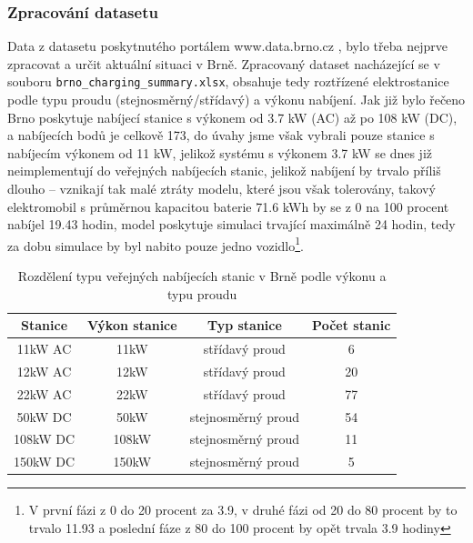 \documentclass[a4paper,11pt]{article}
\begin{document}
\subsubsection{Zpracování datasetu}
\label{dataset-processing}
Data z datasetu poskytnutého portálem www.data.brno.cz \cite{data_brno}, bylo třeba nejprve zpracovat a určit 
aktuální situaci v Brně. Zpracovaný dataset nacházející se v souboru \texttt{brno\_charging\_summary.xlsx},
obsahuje tedy roztřízené elektrostanice podle typu proudu (stejnosměrný/střídavý) a výkonu nabíjení. Jak již bylo
řečeno Brno poskytuje nabíjecí stanice s výkonem od 3.7 kW (AC) až po 108 kW (DC), a nabíjecích bodů je celkově 173,
do úvahy jsme však vybrali pouze stanice s nabíjecím výkonem od 11 kW, jelikož systému s výkonem 3.7 kW se dnes již 
neimplementují do veřejných nabíjecích stanic, jelikož nabíjení by trvalo příliš dlouho -- vznikají tak malé ztráty
modelu, které jsou však tolerovány, takový elektromobil s průměrnou kapacitou baterie 71.6 kWh by se z 0 na 100 procent 
nabíjel 19.43 hodin, model poskytuje simulaci trvající maximálně 24 hodin, tedy za dobu simulace by byl nabito pouze jedno
vozidlo\footnote{V první fázi z 0 do 20 procent za 3.9, v druhé fázi od 20 do 80 procent by to trvalo 11.93 a poslední 
fáze z 80 do 100 procent by opět trvala 3.9 hodiny}.

\begin{table}[h!]
    \centering
    \vspace{0.5cm} %
    \begin{tabular}{|c|c|c|c|}
        \hline
        \textbf{Stanice} & \textbf{Výkon stanice} & \textbf{Typ stanice} & \textbf{Počet stanic}\\
        \hline
        11kW  AC &  11kW   & střídavý proud       & 6  \\
        \hline
        12kW  AC &  12kW   & střídavý proud       & 20  \\
        \hline
        22kW  AC &  22kW   & střídavý proud       & 77  \\
        \hline
        50kW  DC &  50kW   & stejnosměrný proud   & 54  \\
        \hline
        108kW DC &  108kW  & stejnosměrný proud   & 11  \\
        \hline
        150kW DC &  150kW  & stejnosměrný proud   & 5  \\
        \hline
    \end{tabular}
    \caption{Rozdělení typu veřejných nabíjecích stanic v Brně podle výkonu a typu proudu}
    \label{table:charging-stations-distribution}
    \vspace{0.5cm} %
\end{table}
\end{document}
